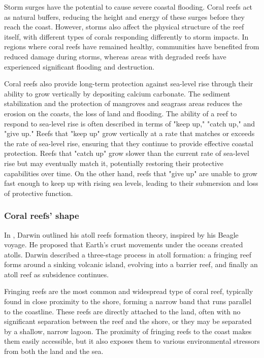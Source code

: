 Storm surges have the potential to cause severe coastal flooding. Coral reefs act as natural buffers, reducing the height and energy of these surges before they reach the coast. However, storms also affect the physical structure of the reef itself, with different types of corals responding differently to storm impacts. In regions where coral reefs have remained healthy, communities have benefited from reduced damage during storms, whereas areas with degraded reefs have experienced significant flooding and destruction. 

Coral reefs also provide long-term protection against sea-level rise through their ability to grow vertically by depositing calcium carbonate. The sediment stabilization and the protection of mangroves and seagrass areas reduces the erosion on the coasts, the loss of land and flooding. The ability of a reef to respond to sea-level rise is often described in terms of "keep up," "catch up," and "give up." Reefs that "keep up" grow vertically at a rate that matches or exceeds the rate of sea-level rise, ensuring that they continue to provide effective coastal protection. Reefs that "catch up" grow slower than the current rate of sea-level rise but may eventually match it, potentially restoring their protective capabilities over time. On the other hand, reefs that "give up" are unable to grow fast enough to keep up with rising sea levels, leading to their submersion and loss of protective function. 

\subsubsection{Coral reefs' shape}
In \citep{Darwin1842}, Darwin outlined his atoll reefs formation theory, inspired by his Beagle voyage. He proposed that Earth's crust movements under the oceans created atolls. Darwin described a three-stage process in atoll formation: a fringing reef forms around a sinking volcanic island, evolving into a barrier reef, and finally an atoll reef as subsidence continues.

Fringing reefs are the most common and widespread type of coral reef, typically found in close proximity to the shore, forming a narrow band that runs parallel to the coastline. These reefs are directly attached to the land, often with no significant separation between the reef and the shore, or they may be separated by a shallow, narrow lagoon. The proximity of fringing reefs to the coast makes them easily accessible, but it also exposes them to various environmental stressors from both the land and the sea.

